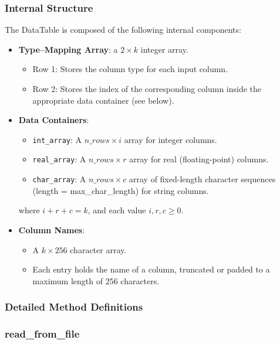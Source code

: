 \documentclass{article}
\begin{document}
\subsubsection{Internal Structure}

The DataTable is composed of the following internal components:

\begin{itemize}
    \item \textbf{Type--Mapping Array}: a \( 2 \times k \) integer array.
    \begin{itemize}
        \item Row 1: Stores the column type for each input column.
        \item Row 2: Stores the index of the corresponding column inside the appropriate data container (see below).
    \end{itemize}
    \item \textbf{Data Containers}:
    \begin{itemize}
        \item \texttt{int\_array}: A \( n\_rows \times i \) array for integer columns.
        \item \texttt{real\_array}: A \( n\_rows \times r \) array for real (floating-point) columns.
        \item \texttt{char\_array}: A \( n\_rows \times c \) array of fixed-length character sequences (length = max\_char\_length) for string columns.
    \end{itemize}
    where \( i + r + c = k \), and each value \( i, r, c \geq 0 \).
    
    \item \textbf{Column Names}:
    \begin{itemize}
        \item A \( k \times 256 \) character array.
        \item Each entry holds the name of a column, truncated or padded to a maximum length of 256 characters.
    \end{itemize}
\end{itemize}

\subsubsection{Detailed Method Definitions}

\subsubsection*{read\_from\_file}%
\end{document}
